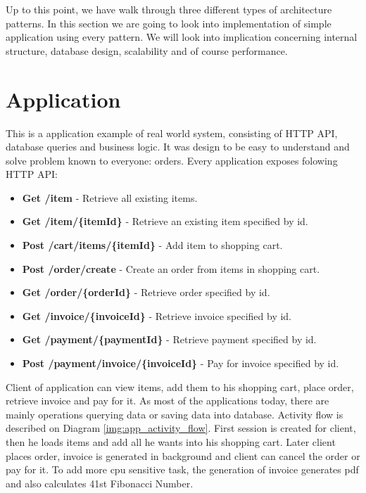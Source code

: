 

Up to this point, we have walk through three different types of architecture patterns. In this section we are going to look into implementation of simple application using every pattern. We will look into implication concerning internal structure, database design, scalability and of course performance.

\section{Application}
This is a application example of real world system, consisting of HTTP API, database queries and business logic. It was design to be easy to understand and solve problem known to everyone: orders. Every application exposes folowing HTTP API:
\begin{itemize}
    \item \textbf{Get /item} - Retrieve all existing items.
    \item \textbf{Get /item/\{itemId\}} - Retrieve an existing item specified by id.
    \item \textbf{Post /cart/items/\{itemId\}} - Add item to shopping cart.
    \item \textbf{Post /order/create} - Create an order from items in shopping cart.
    \item \textbf{Get /order/\{orderId\}} - Retrieve order specified by id.
    \item \textbf{Get /invoice/\{invoiceId\}} - Retrieve invoice specified by id.
    \item \textbf{Get /payment/\{paymentId\}} - Retrieve payment specified by id.
    \item \textbf{Post /payment/invoice/\{invoiceId\}} - Pay for invoice specified by id.
\end{itemize}

Client of application can view items, add them to his shopping cart, place order, retrieve invoice and pay for it. As most of the applications today, there are mainly operations querying data or saving data into database. Activity flow is described on Diagram \ref{img:app_activity_flow}. First session is created for client, then he loads items and add all he wants into his shopping cart. Later client places order, invoice is generated in background and client can cancel the order or pay for it. To add more cpu sensitive task, the generation of invoice generates pdf and also calculates 41st Fibonacci Number.

